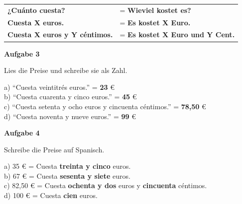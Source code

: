 \documentclass[11pt, a4paper]{article}
\newcommand{\fachfarbe}{spanisch}
\newcommand{\punktebox}[1]{\hfill\fbox{\small \_/#1}}
\newcommand{\loesung}[1]{\textcolor{loesung}{\textbf{#1}}}
\newenvironment{aufgabe}[1]{%
    \needspace{5\baselineskip}%
    \nopagebreak[4]%
    \vspace{10pt}
    \noindent\textbf{\textcolor{\fachfarbe}{Aufgabe #1}}
    \nopagebreak[4]%
    \vspace{5pt}
    \nopagebreak[4]%
    \begin{list}{}{\leftmargin=0pt}
    \item[]
}{%
    \end{list}
}
\newcommand{\es}[1]{\textcolor{\fachfarbe}{\textbf{#1}}}
\begin{document}
\begin{merkkasten}
\begin{tabular}{ll}
\es{¿Cuánto cuesta?} & = \loesung{Wieviel kostet es?} \\[0.8em]
\es{Cuesta X euros.} & = \loesung{Es kostet X Euro.} \\[0.8em]
\es{Cuesta X euros y Y céntimos.} & = \loesung{Es kostet X Euro und Y Cent.} \\
\end{tabular}
\end{merkkasten}

\vspace{10pt}


\begin{aufgabe}{3}
Lies die Preise und schreibe sie als Zahl. \punktebox{4}
\end{aufgabe}

\noindent
a) ``Cuesta veintitrés euros.'' = \loesung{23} € \\[0.8em]
b) ``Cuesta cuarenta y cinco euros.'' = \loesung{45} € \\[0.8em]
c) ``Cuesta setenta y ocho euros y cincuenta céntimos.'' = \loesung{78,50} € \\[0.8em]
d) ``Cuesta noventa y nueve euros.'' = \loesung{99} € \\

\vspace{15pt}


\begin{aufgabe}{4}
Schreibe die Preise auf Spanisch. \punktebox{4}
\end{aufgabe}

\noindent
a) 35 € = Cuesta \loesung{treinta y cinco} euros. \\[0.8em]
b) 67 € = Cuesta \loesung{sesenta y siete} euros. \\[0.8em]
c) 82,50 € = Cuesta \loesung{ochenta y dos} euros y \loesung{cincuenta} céntimos. \\[0.8em]
d) 100 € = Cuesta \loesung{cien} euros. \\
\end{document}
